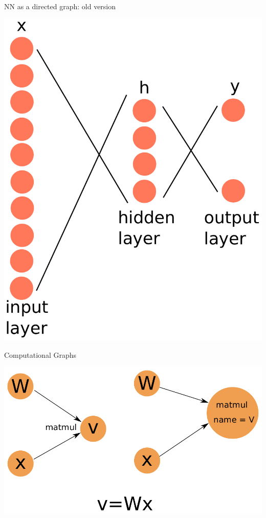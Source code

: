 \documentclass[10pt]{beamer}
\begin{document}
\begin{frame}[fragile]{NN as a directed graph: old version}
\begin{center}
\includegraphics[scale=0.38]{images/OldNN4.pdf}
\end{center}
\end{frame}

\begin{frame}[fragile]{Computational Graphs}
\begin{center}
\includegraphics[scale=0.75]{images/CompGraph1.pdf}
\end{center}
\end{frame}
\end{document}
